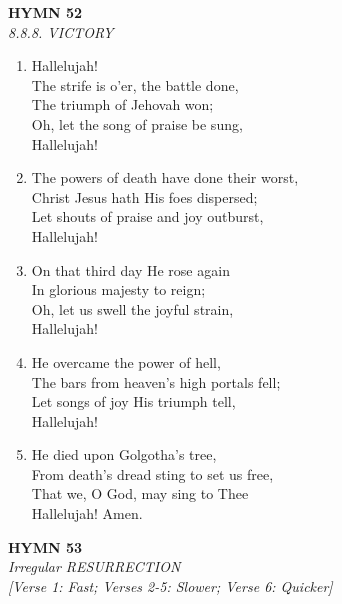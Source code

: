 \newpage
\begin{center}
    {\Large \textbf{HYMN 52}}
    \\
    \textit{8.8.8. VICTORY}
\end{center}
\vspace{1em}

\begin{enumerate}
    \item Hallelujah! \\
        The strife is o'er, the battle done, \\
        The triumph of Jehovah won; \\
        Oh, let the song of praise be sung, \\
        Hallelujah!

    \item The powers of death have done their worst, \\
        Christ Jesus hath His foes dispersed; \\
        Let shouts of praise and joy outburst, \\
        Hallelujah!

    \item On that third day He rose again \\
        In glorious majesty to reign; \\
        Oh, let us swell the joyful strain, \\
        Hallelujah!

    \item He overcame the power of hell, \\
        The bars from heaven's high portals fell; \\
        Let songs of joy His triumph tell, \\
        Hallelujah!

    \item He died upon Golgotha's tree, \\
        From death's dread sting to set us free, \\
        That we, O God, may sing to Thee \\
        Hallelujah! Amen.

\end{enumerate}

\newpage
\begin{center}
    {\Large \textbf{HYMN 53}}
    \\
    \textit{Irregular RESURRECTION}
    \\
    \textit{\small [Verse 1: Fast; Verses 2-5: Slower; Verse 6: Quicker]}
\end{center}
\vspace{1em}

